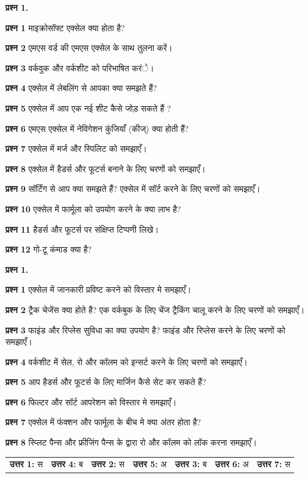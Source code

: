 \begin{descriptionSimple}{\textbf{प्रश्न 1.}}
\item[\textbf{प्रश्न 1}] माइक्रोसॉफ्ट एक्सेल क्या होता है?
\item[\textbf{प्रश्न 2}] एमएस वर्ड की एमएस एक्सेल के साथ तुलना करें।
\item[\textbf{प्रश्न 3}] वर्कवुक और वर्कशीट को परिभाषित करंे।
\item[\textbf{प्रश्न 4}] एक्सेल में लेबलिंग से आपका क्या समझते हैं?
\item[\textbf{प्रश्न 5}] एक्सेल में आप एक नई शीट कैसे जोड़ सकते हैं ?
\item[\textbf{प्रश्न 6}] एमएस एक्सेल में नेविगेशन कुंजियाँ (कीज्) क्या होती हैं?
\item[\textbf{प्रश्न 7}] एक्सेल में मर्ज और स्पिलिट को समझाएँ।
\item[\textbf{प्रश्न 8}] एक्सेल में हैडर्स और फूटर्स बनाने के लिए चरणों को समझाएँ।
\item[\textbf{प्रश्न 9}] सॉर्टिंग से आप क्या समझते हैं? एक्सेल में सॉर्ट करने के लिए चरणों को समझाएँ।
\item[\textbf{प्रश्न 10}] एक्सेल में फार्मूला को उपयोग करने के क्या लाभ है?
\item[\textbf{प्रश्न 11}] हैडर्स और फूटर्स पर संक्षिप्त टिप्पणी लिखे।
\item[\textbf{प्रश्न 12}] गो-टू कंमाड क्या है?					
\end{descriptionSimple}					
\smallskip

\begin{descriptionSimple}{\textbf{प्रश्न 1.}}
\item[\textbf{प्रश्न 1}] एक्सेल में जानकारी प्रविष्ट करने को विस्तार मे समझाएँ।
\item[\textbf{प्रश्न 2}] ट्रैक चेजेंस क्या होते है? एक वर्कबुक के लिए चेंज ट्रैकिंग चालू करने के लिए चरणों को समझाएँ।
\item[\textbf{प्रश्न 3}] फाइंड और रिप्लेस सुविधा का क्या उपयोग है? फाइंड और रिप्लेस करने के लिए चरणों को समझाएँ।
\item[\textbf{प्रश्न 4}] वर्कशीट में सेल, रो और कॉलम को इन्सर्ट करने के लिए चरणों को समझाएँ।
\item[\textbf{प्रश्न 5}] आप हैडर्स और फूटर्स के लिए मार्जिन कैसे सेट कर सकते हैं?
\item[\textbf{प्रश्न 6}] फिल्टर और सॉर्ट आपरेशन को विस्तार मे समझाएँ।
\item[\textbf{प्रश्न 7}] एक्सेल में फंक्शन और फार्मूला के बीच मे क्या अंतर होता है?
\item[\textbf{प्रश्न 8}] स्प्लिट पैन्स और फ्रीजिंग पैन्स के द्वारा रो और कॉलम को लॉक करना समझाएँ।
\end{descriptionSimple}
\bigskip


\begin{tabular}{@{}lllllll}
\textbf{उत्तर 1:} स & 
\textbf{उत्तर 4:} ब &
\textbf{उत्तर 2:} स &
\textbf{उत्तर 5:} अ &
\textbf{उत्तर 3:} ब &
\textbf{उत्तर 6:} अ &
\textbf{उत्तर 7:} स			
\end{tabular}
